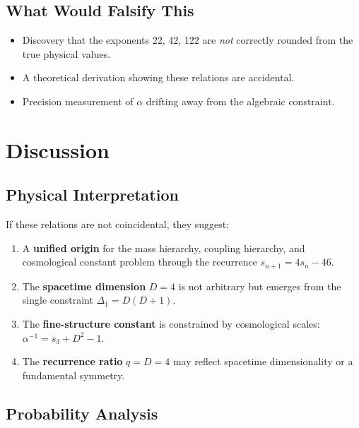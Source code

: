 \documentclass[11pt,a4paper]{article}
\begin{document}
\subsection{What Would Falsify This}

\begin{itemize}
\item Discovery that the exponents 22, 42, 122 are \emph{not} correctly 
rounded from the true physical values.
\item A theoretical derivation showing these relations are accidental.
\item Precision measurement of $\alpha$ drifting away from the algebraic 
constraint.
\end{itemize}

\section{Discussion}

\subsection{Physical Interpretation}

If these relations are not coincidental, they suggest:

\begin{enumerate}
\item A \textbf{unified origin} for the mass hierarchy, coupling hierarchy, 
and cosmological constant problem through the recurrence $s_{n+1} = 4s_n - 46$.

\item The \textbf{spacetime dimension} $D = 4$ is not arbitrary but emerges 
from the single constraint $\Delta_1 = D(D+1)$.

\item The \textbf{fine-structure constant} is constrained by cosmological 
scales: $\alpha^{-1} = s_3 + D^2 - 1$.

\item The \textbf{recurrence ratio} $q = D = 4$ may reflect spacetime 
dimensionality or a fundamental symmetry.
\end{enumerate}

\subsection{Probability Analysis}
\end{document}
